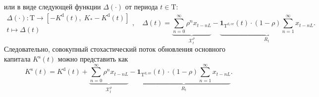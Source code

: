 или в виде следующей функции $\Delta(\cdot)$ от периода $t \in \mathrm{T}$:
\begin{equation}\begin{aligned} \Delta(\cdot) : \mathrm{T} \longrightarrow \left[-K^{\mathrm{d}}(t), \; K_{*} - K^{\mathrm{d}}(t) \right] \\ t \longmapsto \Delta(t) \end{aligned}, \quad \Delta(t) = \underbrace{\sum_{n=0}^{\infty} \rho^{n} x_{t-nL}}_{\mathcal{X}_{t}^{\rho}} - \underbrace{\mathbf 1_{\mathrm{T}^{\mathrm{d,ce}}}(t) \cdot (1- \rho) \sum_{n=1}^{\infty} x_{t-nL}}_{R_{t}}.\end{equation}
Следовательно, совокупный стохастический поток обновления основного капитала $K^{\mathrm{s}}(t)$ можно представить как
\begin{equation}K^{\mathrm{s}}(t) = K^{\mathrm{d}}(t) + \underbrace{\sum_{n=0}^{\infty} \rho^{n} x_{t-nL}}_{\mathcal{X}_{t}^{\rho}} - \underbrace{\mathbf 1_{\mathrm{T}^{\mathrm{d,ce}}}(t) \cdot (1- \rho) \sum_{n=1}^{\infty} x_{t-nL}}_{R_{t}}.\end{equation}